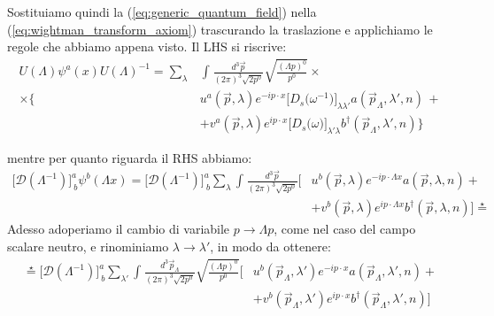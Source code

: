 \documentclass[../main.tex]{subfiles}
\begin{document}
Sostituiamo quindi la (\ref{eq:generic_quantum_field}) nella (\ref{eq:wightman_transform_axiom}) trascurando la traslazione e applichiamo le regole che abbiamo appena visto. Il LHS si riscrive:
\begin{align*}
    U(\Lambda)\psi^a(x)U(\Lambda)^{-1} = \sum_\lambda&\int_{}\frac{d^3\Vec p}{(2\pi)^3\sqrt{2p^0}}\sqrt{\frac{(\Lambda p)^0}{p^0}} \times \\
    \times\Big\{& u^a(\Vec{p},\lambda)e^{-ip\cdot x} \Big[D_s\big(\omega^{-1}\big)\Big]_{\lambda\lambda'} a(\Vec{p}_\Lambda,\lambda',n)\, + \\ 
    &+ v^a(\Vec{p},\lambda)e^{ip\cdot x} \Big[D_s\big(\omega\big)\Big]_{\lambda'\lambda} b^\dagger(\Vec{p}_\Lambda,\lambda',n)\Big\}
\end{align*}

mentre per quanto riguarda il RHS abbiamo:
\begin{align*}
    \big[\mathscr D(\Lambda^{-1})\big]^a_{~b}\psi^b(\Lambda x) = \big[\mathscr D(\Lambda^{-1})\big]^a_{~b}
    \sum_\lambda\int_{}\frac{d^3\Vec p}{(2\pi)^3\sqrt{2p^0}}\big[&u^b(\Vec{p},\lambda)e^{-ip\cdot \Lambda x}a(\Vec{p},\lambda,n) +\\
    &+ v^b(\Vec{p},\lambda)e^{ip\cdot \Lambda x}b^\dagger(\Vec{p},\lambda,n)\big] \overset{\star}{=}
\end{align*}
Adesso adoperiamo il cambio di variabile $p\rightarrow \Lambda p$, come nel caso del campo scalare neutro, e rinominiamo $\lambda \rightarrow \lambda'$, in modo da ottenere:
\begin{align*}
    \overset{\star}{=} \big[\mathscr D(\Lambda^{-1})\big]^a_{~b}
    \sum_{\lambda'}\int_{}\frac{d^3\Vec p_\Lambda}{(2\pi)^3\sqrt{2p^0}}\sqrt{\frac{(\Lambda p)^0}{p^0}}
    \big[&u^b(\Vec{p}_\Lambda,\lambda')e^{-ip\cdot x}a(\Vec{p}_\Lambda,\lambda',n) +\\
    &+ v^b(\Vec{p}_\Lambda,\lambda')e^{ip\cdot x}b^\dagger(\Vec{p}_\Lambda,\lambda',n)\big] 
\end{align*}
\end{document}
